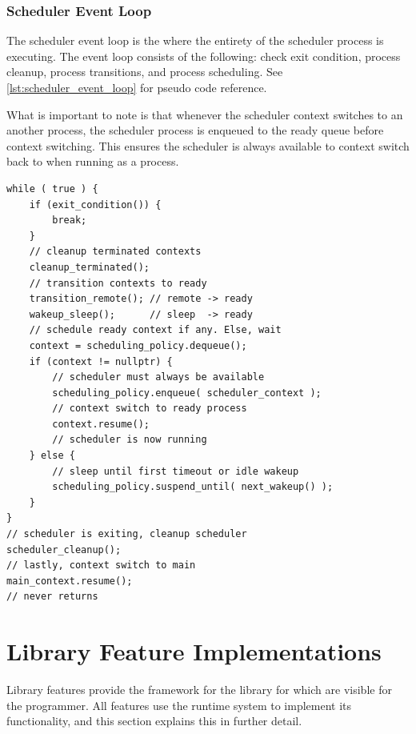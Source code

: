 \FloatBarrier
\subsubsection{Scheduler Event Loop}


The scheduler event loop is the where the entirety of the scheduler process is executing. The event loop consists of the following: check exit condition, process cleanup, process transitions, and process scheduling. See \cref{lst:scheduler_event_loop} for pseudo code reference.

What is important to note is that whenever the scheduler context switches to an another process, the scheduler process is enqueued to the ready queue before context switching. This ensures the scheduler is always available to context switch back to when running as a process. 

\begin{lstfloat}
\begin{lstlisting}[caption={Scheduler event loop pseudo code.}, label={lst:scheduler_event_loop}, style={CustomC}, xleftmargin={2em}]
while ( true ) {
    if (exit_condition()) {
        break;
    }
    // cleanup terminated contexts
    cleanup_terminated();
    // transition contexts to ready
    transition_remote(); // remote -> ready
    wakeup_sleep();      // sleep  -> ready
    // schedule ready context if any. Else, wait
    context = scheduling_policy.dequeue();
    if (context != nullptr) {
        // scheduler must always be available
        scheduling_policy.enqueue( scheduler_context );
        // context switch to ready process
        context.resume();
        // scheduler is now running
    } else {
        // sleep until first timeout or idle wakeup
        scheduling_policy.suspend_until( next_wakeup() );
    }
}
// scheduler is exiting, cleanup scheduler
scheduler_cleanup();
// lastly, context switch to main
main_context.resume();
// never returns
\end{lstlisting}
\end{lstfloat}

\FloatBarrier
\section{Library Feature Implementations}

Library features provide the framework for the library for which are visible for the programmer. All features use the runtime system to implement its functionality, and this section explains this in further detail.


